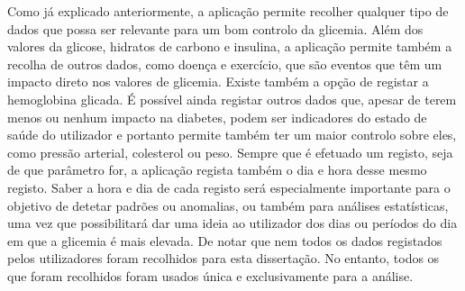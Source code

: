 Como já explicado anteriormente, a aplicação permite recolher qualquer tipo de dados que possa ser relevante para um bom controlo da glicemia. Além dos valores da glicose, hidratos de carbono e insulina, a aplicação permite também a recolha de outros dados, como doença e exercício, que são eventos que têm um impacto direto nos valores de glicemia. Existe também a opção de registar a hemoglobina glicada. É possível ainda registar outros dados que, apesar de terem menos ou nenhum impacto na diabetes, podem ser indicadores do estado de saúde do utilizador e portanto permite também ter um maior controlo sobre eles, como pressão arterial, colesterol ou peso.
Sempre que é efetuado um registo, seja de que parâmetro for, a aplicação regista também o dia e hora desse mesmo registo. Saber a hora e dia de cada registo será especialmente importante para o objetivo de detetar padrões ou anomalias, ou também para análises estatísticas, uma vez que possibilitará dar uma ideia ao utilizador dos dias ou períodos do dia em que a glicemia é mais elevada. De notar que nem todos os dados registados pelos utilizadores foram recolhidos para esta dissertação. No entanto, todos os que foram recolhidos foram usados única e exclusivamente para a análise. 


